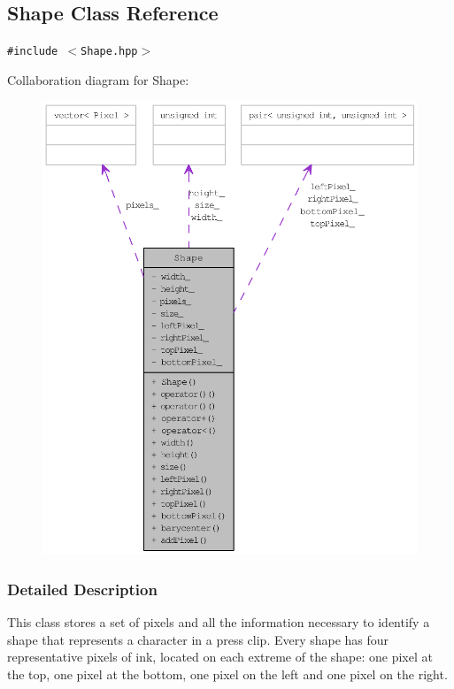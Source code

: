 \hypertarget{class_shape}{
\subsection{Shape Class Reference}
\label{class_shape}
}
{\tt \#include $<$Shape.hpp$>$}

Collaboration diagram for Shape:\nopagebreak
\begin{figure}[H]
\begin{center}
\leavevmode
\includegraphics[width=400pt]{class_shape__coll__graph}
\end{center}
\end{figure}


\subsubsection{Detailed Description}
This class stores a set of pixels and all the information necessary to identify a shape that represents a character in a press clip. Every shape has four representative pixels of ink, located on each extreme of the shape: one pixel at the top, one pixel at the bottom, one pixel on the left and one pixel on the right.

